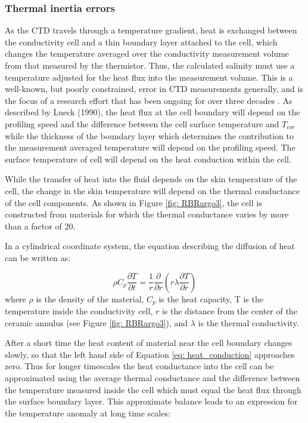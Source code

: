 \documentclass{ametsocV6.1}
\begin{document}
\subsubsection{Thermal inertia errors}
\label{sec: plunging}

As the CTD travels through a temperature gradient, heat is exchanged between the conductivity cell and a thin boundary layer attached to the cell, which changes the temperature averaged over the conductivity measurement volume from that measured by the thermistor.
Thus, the calculated salinity must use a temperature adjusted for the heat flux into the measurement volume.
This is a well-known, but poorly constrained, error in CTD measurements generally, and is the focus of a research effort that has been ongoing for over three decades \citep{Lueck_1990b, Morison_1994, Johnson_2007, Martini_2019, Johnson_2020, Halverson_2020}.
As described by Lueck (1990), the heat flux at the cell boundary will depend on the profiling speed and the difference between the cell surface temperature and $T_{cor}$ while the thickness of the boundary layer which determines the contribution to the measurement averaged temperature will depend on the profiling speed.
The surface temperature of cell will depend on the heat conduction within the cell.

While the transfer of heat into the fluid depends on the skin temperature of the cell, the change in the skin temperature will depend on the thermal conductance of the cell components.  
As shown in Figure \ref{fig: RBRargo3}, the cell is constructed from materials for which the thermal conductance varies by more than a factor of 20.

In a cylindrical coordinate system, the equation describing the diffusion of heat can be written as:

\begin{equation}
\rho C_p \frac{\partial T}{\partial t} = \frac{1}{r}\frac{\partial}{\partial r}\left(r\lambda\frac{\partial T}{\partial r}\right)
\label{eq: heat_conduction}
\end{equation}
where $\rho$ is the density of the material, $C_p$ is the heat capacity, T is the temperature inside the conductivity cell,  $r$ is the distance from the center of the ceramic annulus (see Figure \ref{fig: RBRargo3}), and $\lambda$ is the thermal conductivity.

After a short time the heat content of material near the cell boundary changes slowly, so that the left hand side of Equation \ref{eq: heat_conduction} approaches zero. Thus for longer timescales the heat conductance into the cell can be approximated using the average thermal conductance and the difference between the temperature measured inside the cell which must equal the heat flux through the surface boundary layer. This approximate balance leads to an expression for the temperature anomaly at long time scales:
\end{document}
